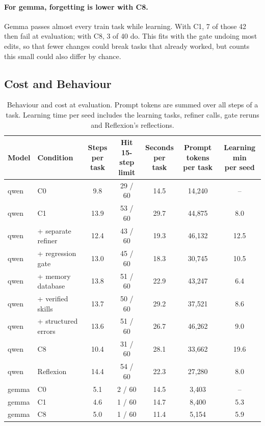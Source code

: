 \paragraph{For gemma, forgetting is lower with C8.}
Gemma passes almost every train task while learning. With C1, 7 of those 42 then fail at
evaluation; with C8, 3 of 40 do. This fits with the gate undoing most edits, so that fewer changes
could break tasks that already worked, but counts this small could also differ by chance.

\subsection{Cost and Behaviour}

\begin{table}[t]
\centering
\small
\setlength{\tabcolsep}{4pt}
\begin{tabular}{llccccc}
\toprule
Model & Condition & \makecell{Steps\\per task} & \makecell{Hit 15-step\\limit} & \makecell{Seconds\\per task}
  & \makecell{Prompt tokens\\per task} & \makecell{Learning min\\per seed} \\
\midrule
qwen  & C0                  & 9.8  & 29 / 60 & 14.5 & 14{,}240 & -- \\
qwen  & C1                  & 13.9 & 53 / 60 & 29.7 & 44{,}875 & 8.0 \\
qwen  & + separate refiner  & 12.4 & 43 / 60 & 19.3 & 46{,}132 & 12.5 \\
qwen  & + regression gate   & 13.0 & 45 / 60 & 18.3 & 30{,}745 & 10.5 \\
qwen  & + memory database   & 13.8 & 51 / 60 & 22.9 & 43{,}247 & 6.4 \\
qwen  & + verified skills   & 13.7 & 50 / 60 & 29.2 & 37{,}521 & 8.6 \\
qwen  & + structured errors & 13.6 & 51 / 60 & 26.7 & 46{,}262 & 9.0 \\
qwen  & C8                  & 10.4 & 31 / 60 & 28.1 & 33{,}662 & 19.6 \\
qwen  & Reflexion           & 14.4 & 54 / 60 & 22.3 & 27{,}280 & 8.0 \\
\midrule
gemma & C0                  & 5.1  & 2 / 60  & 14.5 & 3{,}403  & -- \\
gemma & C1                  & 4.6  & 1 / 60  & 14.7 & 8{,}400  & 5.3 \\
gemma & C8                  & 5.0  & 1 / 60  & 11.4 & 5{,}154  & 5.9 \\
\bottomrule
\end{tabular}
\caption{Behaviour and cost at evaluation. Prompt tokens are summed over all steps of a task.
Learning time per seed includes the learning tasks, refiner calls, gate reruns and Reflexion's reflections.}
\label{tab:cost}
\end{table}

